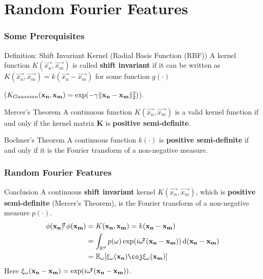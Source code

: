 \documentclass[10pt]{../formats/RU}
\begin{document}
\section{Random Fourier Features}
\begin{frame}
\frametitle{Some Prerequisites}
\begin{alertblock}{Definition: Shift Invariant Kernel (Radial Basis Function (RBF))}
  A kernel function $K(\vec{x_n}, \vec{x_m})$ is called \textbf{shift invariant} if it can be written as $K(\vec{x_n}, \vec{x_m}) = k(\vec{x_n}-\vec{x_m})$ for some function $g(\cdot)$

  (\eg $K_{Gaussian}(\mathbf{x_n},\mathbf{x_m})=\exp(-\gamma\lVert\mathbf{x_n}-\mathbf{x_m}\rVert_2^2)$).
\end{alertblock}
\begin{block}{Mercer’s Theorem}
  A continuous function $K(\vec{x_n}, \vec{x_m})$ is a valid kernel function if and only if the kernel matrix $\mathbf{K}$ is \textbf{positive semi-definite}.
\end{block}
\begin{block}{Bochner's Theorem}
  A continuous function $k(\cdot)$ is \textbf{positive semi-definite} if and only if it is the Fourier transform of a non-negative measure.
\end{block}
\end{frame}
\begin{frame}
  \frametitle{Random Fourier Features}
  \begin{exampleblock}{Conclusion}
    A continuous \textbf{shift invariant} kernel $K(\vec{x_n}, \vec{x_m})$, which is \textbf{positive semi-definite} (Mercer's Theorem), is the Fourier transform of a non-negative measure $p(\cdot)$.
    \begin{align}
      \phi(\vec{x_n})\trn\phi(\vec{x_m})
      &= K(\vec{x_n}, \vec{x_m}) = k(\vec{x_n}-\vec{x_m}) \\
      &=\int_{\R^d}p(\vec{\omega})\exp(i\vec{\omega}\trn(\vec{x_n}-\vec{x_m}))\diff(\vec{x_n}-\vec{x_m}) \\
      &= \mathbb{E}_{\vec{\omega}}\bracks*{\xi_{\vec{\omega}}(\vec{x_n})\coj\xi_{\vec{\omega}}(\vec{x_m})}\label{rffinC}
    \end{align}
    Here
    $
    \xi_{\mathbf{\omega}}(\mathbf{x_n-x_m})=\exp(i\mathbf{\omega}{}^{\mkern-4mu\intercal}(\mathbf{x_n-x_m}))
    $.
  \end{exampleblock}
\end{frame}
\end{document}
